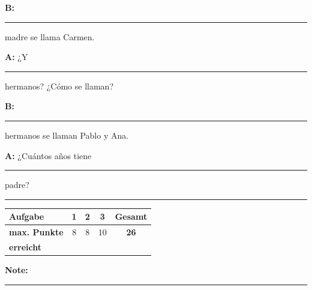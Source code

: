 \documentclass[11pt, a4paper]{article}
\newcommand{\luecke}[1]{\rule{#1}{0.4pt}}
\begin{document}
\noindent
\textbf{B:} \luecke{2cm} madre se llama Carmen.

\vspace{0.8em}

\noindent
\textbf{A:} ¿Y \luecke{2cm} hermanos? ¿Cómo se llaman?

\vspace{0.8em}

\noindent
\textbf{B:} \luecke{2cm} hermanos se llaman Pablo y Ana.

\vspace{0.8em}

\noindent
\textbf{A:} ¿Cuántos años tiene \luecke{2cm} padre?


\vspace{25pt}
\hrule
\vspace{10pt}

\noindent
\begin{tabularx}{\textwidth}{|X|c|c|c||c|}
\hline
\textbf{Aufgabe} & 1 & 2 & 3 & \textbf{Gesamt} \\
\hline
\textbf{max. Punkte} & 8 & 8 & 10 & \textbf{26} \\
\hline
\textbf{erreicht} & & & & \\[0.8em]
\hline
\end{tabularx}

\vspace{10pt}

\begin{flushright}
\textbf{Note:} \luecke{2cm}
\end{flushright}
\end{document}
